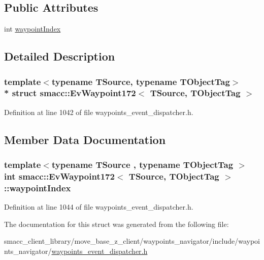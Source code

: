 \subsection*{Public Attributes}
\begin{DoxyCompactItemize}
\item 
int \hyperlink{structsmacc_1_1EvWaypoint172_a99529fbdea335fefc7f21a48adad8d52}{waypoint\+Index}
\end{DoxyCompactItemize}


\subsection{Detailed Description}
\subsubsection*{template$<$typename T\+Source, typename T\+Object\+Tag$>$\\*
struct smacc\+::\+Ev\+Waypoint172$<$ T\+Source, T\+Object\+Tag $>$}



Definition at line 1042 of file waypoints\+\_\+event\+\_\+dispatcher.\+h.



\subsection{Member Data Documentation}
\subsubsection[{\texorpdfstring{waypoint\+Index}{waypointIndex}}]{\setlength{\rightskip}{0pt plus 5cm}template$<$typename T\+Source , typename T\+Object\+Tag $>$ int {\bf smacc\+::\+Ev\+Waypoint172}$<$ T\+Source, T\+Object\+Tag $>$\+::waypoint\+Index}\hypertarget{structsmacc_1_1EvWaypoint172_a99529fbdea335fefc7f21a48adad8d52}{}\label{structsmacc_1_1EvWaypoint172_a99529fbdea335fefc7f21a48adad8d52}


Definition at line 1044 of file waypoints\+\_\+event\+\_\+dispatcher.\+h.



The documentation for this struct was generated from the following file\+:\begin{DoxyCompactItemize}
\item 
smacc\+\_\+client\+\_\+library/move\+\_\+base\+\_\+z\+\_\+client/waypoints\+\_\+navigator/include/waypoints\+\_\+navigator/\hyperlink{waypoints__event__dispatcher_8h}{waypoints\+\_\+event\+\_\+dispatcher.\+h}\end{DoxyCompactItemize}
